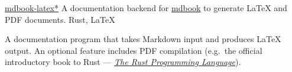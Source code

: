 \showoff
{\textcolor{my-blue}{\href{https://liambeckman.com/mdbook-latex}{mdbook-latex*}}}
{A documentation backend for \textcolor{my-blue}{\href{https://github.com/rust-lang/mdBook}{mdbook}} to generate \LaTeX{} and PDF documents.}
{Rust, \LaTeX{}}
{}

A documentation program that takes Markdown input and produces \LaTeX{} output. An optional feature includes PDF compilation (e.g.\ the official introductory book to Rust --- \textcolor{my-blue}{\href{https://github.com/lbeckman314/mdbook-latex/releases/latest/download/The.Rust.Programming.Language.pdf}{\emph{The Rust Programming Language}}}).

